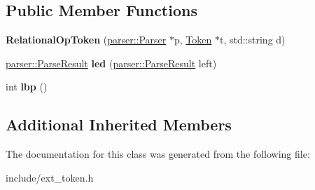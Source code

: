 \subsection*{Public Member Functions}
\begin{DoxyCompactItemize}
\item 
{\bfseries Relational\+Op\+Token} (\hyperlink{classfcal_1_1parser_1_1Parser}{parser\+::\+Parser} $\ast$p, \hyperlink{classfcal_1_1scanner_1_1Token}{Token} $\ast$t, std\+::string d)\hypertarget{classfcal_1_1scanner_1_1RelationalOpToken_a0f7df80e780e0f43e31536d2d528d596}{}\label{classfcal_1_1scanner_1_1RelationalOpToken_a0f7df80e780e0f43e31536d2d528d596}

\item 
\hyperlink{classfcal_1_1parser_1_1ParseResult}{parser\+::\+Parse\+Result} {\bfseries led} (\hyperlink{classfcal_1_1parser_1_1ParseResult}{parser\+::\+Parse\+Result} left)\hypertarget{classfcal_1_1scanner_1_1RelationalOpToken_aeb44d196866916b7d121da40a1d318f1}{}\label{classfcal_1_1scanner_1_1RelationalOpToken_aeb44d196866916b7d121da40a1d318f1}

\item 
int {\bfseries lbp} ()\hypertarget{classfcal_1_1scanner_1_1RelationalOpToken_ac96b280b7e5993c93d7b245deaefffb1}{}\label{classfcal_1_1scanner_1_1RelationalOpToken_ac96b280b7e5993c93d7b245deaefffb1}

\end{DoxyCompactItemize}
\subsection*{Additional Inherited Members}


The documentation for this class was generated from the following file\+:\begin{DoxyCompactItemize}
\item 
include/ext\+\_\+token.\+h\end{DoxyCompactItemize}
